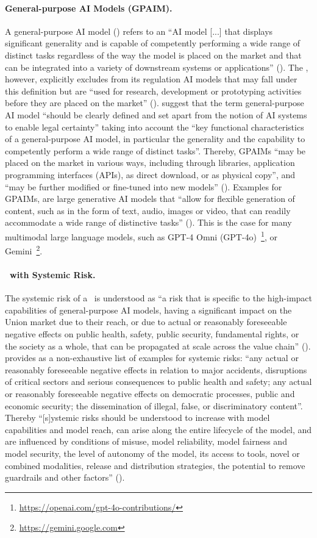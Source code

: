 \paragraph{General-purpose AI Models (GPAIM).}
%
A general-purpose AI model (\GPAIM) refers to an ``AI model [...] that displays significant
generality and is capable of competently performing a wide range of distinct tasks
regardless of the way the model is placed on the market and that can be integrated into a
variety of downstream systems or applications'' (). 
%
The \EUAIAct, however, explicitly excludes from its regulation AI models that may fall under this definition but are ``used for
research, development or prototyping activities before they are placed on the market'' ().
%
 suggest that the term general-purpose AI model ``should be clearly defined and set apart from the
notion of AI systems to enable legal certainty'' taking into account the ``key
functional characteristics of a general-purpose AI model, in particular the generality and
the capability to competently perform a wide range of distinct tasks''. 
%
Thereby, GPAIMs ``may
be placed on the market in various ways, including through libraries, application
programming interfaces (APIs), as direct download, or as physical copy'', and ``may be further modified or fine-tuned into new models'' ().
%
Examples for GPAIMs, are large generative AI models that ``allow for flexible generation of content, such as in the form of text, audio, images
or video, that can readily accommodate a wide range of distinctive tasks'' ().
%
This is the case for many multimodal large language models, such as GPT-4 Omni (GPT-4o)~\footnote{\url{https://openai.com/gpt-4o-contributions/}}, or Gemini~\footnote{\url{https://gemini.google.com}}.

\paragraph{\GPAIM\ with Systemic Risk.} 
The systemic risk of a \GPAIM\ is understood as ``a risk that is specific to the high-impact capabilities of
general-purpose AI models, having a significant impact on the Union market due to their
reach, or due to actual or reasonably foreseeable negative effects on public health, safety,
public security, fundamental rights, or the society as a whole, that can be propagated at
scale across the value chain'' (). 
%
 provides as a non-exhaustive list of examples for systemic risks:
``any actual or reasonably foreseeable negative effects in relation to major accidents,
disruptions of critical sectors and serious consequences to public health and safety; any
actual or reasonably foreseeable negative effects on democratic processes, public and
economic security; the dissemination of illegal, false, or discriminatory content''. Thereby ``[s]ystemic
risks should be understood to increase with model capabilities and model reach, can arise
along the entire lifecycle of the model, and are influenced by conditions of misuse, model
reliability, model fairness and model security, the level of autonomy of the model, its
access to tools, novel or combined modalities, release and distribution strategies, the
potential to remove guardrails and other factors'' (). 

